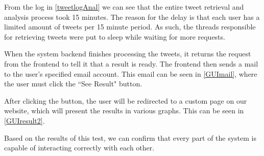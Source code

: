 From the log in \autoref{tweetlogAnal} we can see that the entire tweet
retrieval and analysis process took 15 minutes. The reason for the delay is that
each user has a limited amount of tweets per 15 minute period. As such, the
threads responsible for retrieving tweets were put to sleep while waiting for
more requests.\nl

When the system backend finishes processing the tweets, it returns the request
from the frontend to tell it that a result is ready. The frontend then sends a
mail to the user's specified email account. This email can be seen in
\autoref{GUImail}, where the user must click the ``See Result" button.\nl

After clicking the button, the user will be redirected to a custom page on our
website, which will present the results in various graphs. This can be seen in
\autoref{GUIresult2}.\nl

Based on the results of this test, we can confirm that every part of the system
is capable of interacting correctly with each other.





